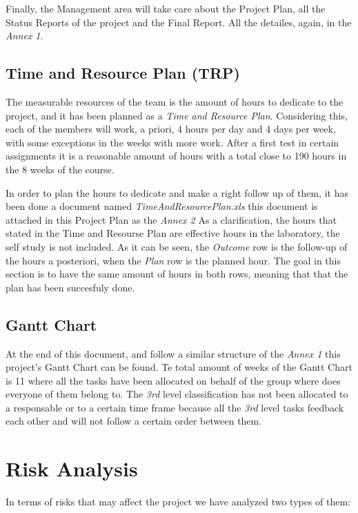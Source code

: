 \documentclass[11pt]{article}
\begin{document}
Finally, the Management area will take care about the Project Plan, all the Status Reports of the project and the Final Report. All the detailes, again, in the \textit{Annex 1}.

\subsection*{Time and Resource Plan (TRP)}
The measurable resources of the team is the amount of hours to dedicate to the project, and it has been planned as a \textit{Time and Resource Plan}. Considering this, each of the members will work, a priori, 4 hours per day and 4 days per week, with some exceptions in the weeks with more work. After a first test in certain assignments it is a reasonable amount of hours with a total close to 190 hours in the 8 weeks of the course.

In order to plan the hours to dedicate and make a right follow up of them, it has been done a document named \textit{TimeAndResourcePlan.xls} this document is attached in this Project Plan as the \textit{Annex 2} As a clarification, the hours that stated in the Time and Resourse Plan are effective hours in the laboratory, the self study is not included. As it can be seen, the \textit{Outcome} row is the follow-up of the hours a posteriori, when the \textit{Plan} row is the planned hour. The goal in this section is to have the same amount of hours in both rows, meaning that that the plan has been succesfuly done.

\subsection*{Gantt Chart}
At the end of this document, and follow a similar structure of the \textit{Annex 1} this project's Gantt Chart can be found. Te total amount of weeks of the Gantt Chart is 11 where all the tasks have been allocated on behalf of the group where does everyone of them belong to. The \textit{3rd} level classification has not been allocated to a responsable or to a certain time frame because all the \textit{3rd} level tasks feedback each other and will not follow a certain order between them.

\section{Risk Analysis}

In terms of risks that may affect the project we have analyzed two types of them:
\end{document}
